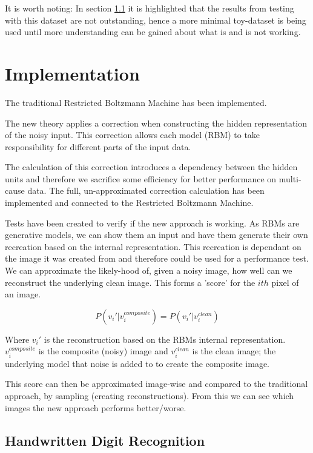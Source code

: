It is worth noting: In section \ref{SS:HDR} it is highlighted that the results from testing with this dataset are not outstanding, hence a more minimal toy-dataset is being used until more understanding can be gained about what is and is not working.

\section{Implementation}\label{S:Implementation}

The traditional Restricted Boltzmann Machine has been implemented. 

The new theory applies a correction when constructing the hidden representation of the noisy input. This correction allows each model (RBM) to take responsibility for different parts of the input data. 

The calculation of this correction introduces a dependency between the hidden units and therefore we sacrifice some efficiency for better performance on multi-cause data.
The full, un-approximated correction calculation has been implemented and connected to the Restricted Boltzmann Machine. 

Tests have been created to verify if the new approach is working.
As RBMs are generative models, we can show them an input and have them generate their own recreation based on the internal representation. This recreation is dependant on the image it was created from and therefore could be used for a performance test. 
We can approximate the likely-hood of, given a noisy image, how well can we reconstruct the underlying clean image. This forms a 'score' for the $ith$ pixel of an image. 

$$  P( v_i' | v_i^{composite}) = P(v_i' | v_i^{clean}  ) $$

Where $ v_i' $ is the reconstruction based on the RBMs internal representation. $ v_i^{composite} $ is the composite (noisy) image and $ v_i^{clean} $ is the clean image; the underlying model that noise is added to to create the composite image.

This score can then be approximated image-wise and compared to the traditional approach, by sampling (creating reconstructions). From this we can see which images the new approach performs better/worse.

\subsection{Handwritten Digit Recognition}\label{SS:HDR}
 
